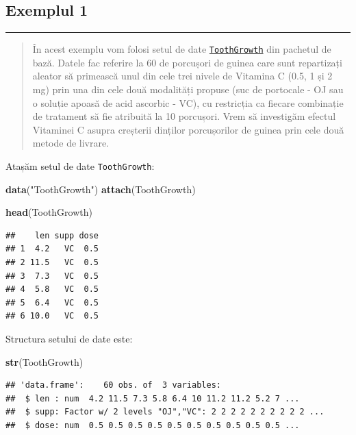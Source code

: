 \documentclass[]{article}
\newenvironment{Shaded}{\begin{snugshade}}{\end{snugshade}}
\newcommand{\KeywordTok}[1]{\textcolor[rgb]{0.13,0.29,0.53}{\textbf{{#1}}}}
\newcommand{\StringTok}[1]{\textcolor[rgb]{0.31,0.60,0.02}{{#1}}}
\newcommand{\NormalTok}[1]{{#1}}
\begin{document}
\subsection{Exemplul 1}\label{exemplul-1-1}

\begin{center}\rule{0.5\linewidth}{\linethickness}\end{center}

\begin{quote}
În acest exemplu vom folosi setul de date
\href{http://jn.nutrition.org/content/33/5/491.full.pdf}{\texttt{ToothGrowth}}
din pachetul de bază. Datele fac referire la 60 de porcușori de guinea
care sunt repartizați aleator să primească unul din cele trei nivele de
Vitamina C (0.5, 1 și 2 mg) prin una din cele două modalități propuse
(suc de portocale - OJ sau o soluție apoasă de acid ascorbic - VC), cu
restricția ca fiecare combinație de tratament să fie atribuită la 10
porcușori. Vrem să investigăm efectul Vitaminei C asupra creșterii
dinților porcușorilor de guinea prin cele două metode de livrare.
\end{quote}

Atașăm setul de date \texttt{ToothGrowth}:

\begin{Shaded}
\begin{Highlighting}[]
\KeywordTok{data}\NormalTok{(}\StringTok{"ToothGrowth"}\NormalTok{)}
\KeywordTok{attach}\NormalTok{(ToothGrowth)}

\KeywordTok{head}\NormalTok{(ToothGrowth)}
\end{Highlighting}
\end{Shaded}

\begin{verbatim}
##    len supp dose
## 1  4.2   VC  0.5
## 2 11.5   VC  0.5
## 3  7.3   VC  0.5
## 4  5.8   VC  0.5
## 5  6.4   VC  0.5
## 6 10.0   VC  0.5
\end{verbatim}

Structura setului de date este:

\begin{Shaded}
\begin{Highlighting}[]
\KeywordTok{str}\NormalTok{(ToothGrowth)}
\end{Highlighting}
\end{Shaded}

\begin{verbatim}
## 'data.frame':    60 obs. of  3 variables:
##  $ len : num  4.2 11.5 7.3 5.8 6.4 10 11.2 11.2 5.2 7 ...
##  $ supp: Factor w/ 2 levels "OJ","VC": 2 2 2 2 2 2 2 2 2 2 ...
##  $ dose: num  0.5 0.5 0.5 0.5 0.5 0.5 0.5 0.5 0.5 0.5 ...
\end{verbatim}
\end{document}
